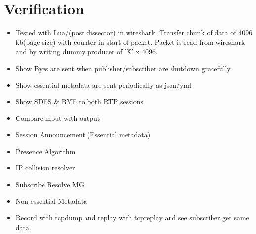 \section{Verification} \label{sec:design:verification}
\begin{itemize}
	\item Tested with Lua/(post dissector) in wireshark. Transfer chunk of data of 4096 kb(page size) with counter in start of packet. Packet is read from wireshark and by writing dummy producer of 'X' x 4096.

	\item Show Byes are sent when publisher/subscriber are shutdown gracefully

	\item Show essential metadata are sent periodically as json/yml
	\item Show SDES \& BYE to both RTP sessions
	
\end{itemize}



\begin{itemize}
	\item Compare \con{} input with \pro{} output
	\item Session Announcement (Essential metadata)
	\item Presence Algorithm
	\item IP collision resolver
	\item Subscribe Resolve MG
	\item Non-essential Metadata
	\item Record with tcpdump and replay with tcpreplay and see subscriber get same data.
\end{itemize}


